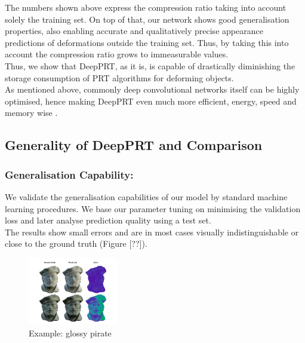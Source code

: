 The numbers shown above express the compression ratio taking into account solely the training set. On top of that, our network shows good generalisation properties, also enabling accurate and qualitatively precise appearance predictions of deformations outside the training set. Thus, by taking this into account the compression ratio grows to immeasurable values. 
\\
Thus, we show that DeepPRT, as it is, is capable of drastically diminishing the storage consumption of PRT algorithms for deforming objects. 
\\
As mentioned above, commonly deep convolutional networks itself can be highly optimised, hence making DeepPRT even much more efficient, energy, speed and memory wise \cite{Survey_NN_Compression}. 
\subsection*{Generality of DeepPRT and Comparison}
\subsubsection*{Generalisation Capability:}
We validate the generalisation capabilities of our model by standard machine learning procedures. We base our parameter tuning on minimising the validation loss and later analyse prediction quality using a test set.\\ 
The results show small errors and are in most cases visually indistinguishable or close to the ground truth (Figure [??]). 
\begin{figure}[H]
  \centering
    \includegraphics[width=0.35\textwidth]{Figures/glossy_pirate.pdf}
     \caption{Example: glossy pirate}
     \label{Fig: glossy_pirate}
\end{figure}

